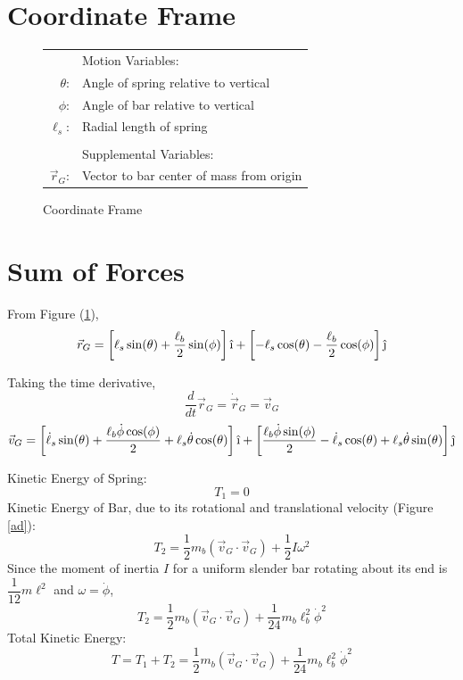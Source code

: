 \documentclass[12pt]{report}
\begin{document}
\begin{flushleft}
\section{Coordinate Frame} \label{section:coord}
\begin{figure}[!htp]
    \begin{minipage}[c]{.4\textwidth}
      \center
      
      \caption{Coordinate Frame}
      \label{coord}
      \vspace{2ex}
    \end{minipage}%
    \begin{minipage}[c]{.6\textwidth}
      \center
      \begin{tabular}{rl}
      & \quad Motion Variables: \\
      $\theta$:& Angle of spring relative to vertical\\
      $\phi$:& Angle of bar relative to vertical\\
      $\ell_s$:& Radial length of spring \\
      \\
      & \quad Supplemental Variables: \\
      $\vec{r}_G$:& Vector to bar center of mass from origin \\
    \end{tabular}
    \end{minipage}
\end{figure}
\newpage
\section{Sum of Forces}
From Figure (\ref{coord}),
$$\vec{r}_G = \left[\ell_s\sin(\theta) + \frac{\ell_b}{2}\sin(\phi)\right]\hat{\textrm{\i}}
 + \left[-\ell_s\cos(\theta) - \frac{\ell_b}{2}\cos(\phi)\right]\hat{\textrm{\j}}$$

Taking the time derivative,
$$\frac{d}{dt}\vec{r}_G = \dot{\vec{r}}_G = \vec{v}_G$$
$$
\vec{v}_G =
\left[\dot{\ell}_s\sin(\theta) + \frac{\ell_b\dot{\phi}\cos(\phi)}{2} +
\ell_s\dot{\theta}\cos(\theta)\right]\hat{\textrm{\i}} +
\left[\frac{\ell_b\dot{\phi}\sin(\phi)}{2} -
\dot{\ell}_s\cos(\theta) + \ell_s\dot{\theta}\sin(\theta)\right]\hat{\textrm{\j}}
$$

Kinetic Energy of Spring:
$$T_1 = 0$$
Kinetic Energy of Bar, due to its rotational and translational velocity (Figure \ref{ad}):
$$T_2 = \frac{1}{2}m_{b}(\vec{v}_G \cdot \vec{v}_G) + \frac{1}{2}I\omega^2$$
Since the moment of inertia $I$ for a uniform slender bar rotating about its end is
$\dfrac{1}{12}m\ell^2$ and $\omega = \dot{\phi}$,
$$T_2 = \frac{1}{2}m_{b}(\vec{v}_G \cdot \vec{v}_G) + \frac{1}{24}m_{b}\ell_b^2\dot{\phi}^2$$
Total Kinetic Energy:
\begin{equation}
T = T_1 + T_2 = \frac{1}{2}m_{b}(\vec{v}_G \cdot \vec{v}_G) + \frac{1}{24}m_{b}\ell_b^2\dot{\phi}^2
\end{equation}


\end{flushleft}
\end{document}
